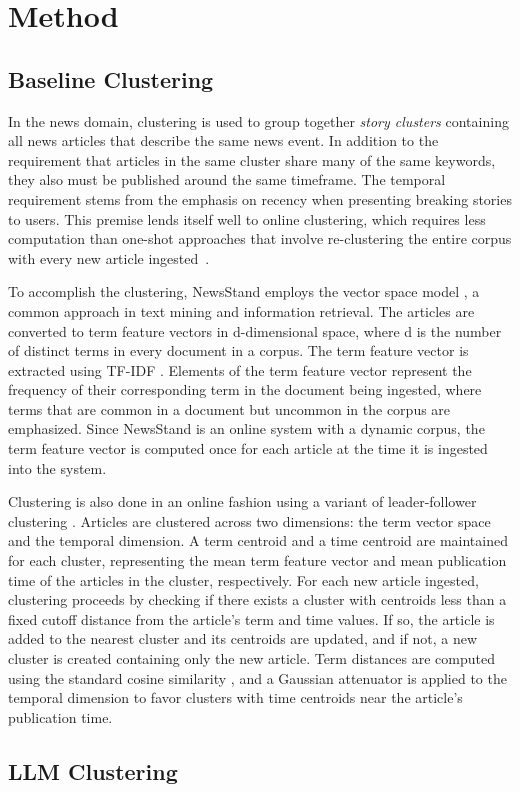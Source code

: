 \section{Method}\label{section:method}


\subsection{Baseline Clustering}
In the news domain, clustering is used to group together \emph{story clusters} containing all news articles that describe the same news event. In addition to the requirement that articles in the same cluster share many of the same keywords, they also must be published around the same timeframe. The temporal requirement stems from the emphasis on recency when presenting breaking stories to users. This premise lends itself well to online clustering, which requires less computation than one-shot approaches that involve re-clustering the entire corpus with every new article ingested~\cite{Teit08}.

To accomplish the clustering, NewsStand employs the vector space model \cite{salton}, a common approach in text mining and information retrieval. The articles are converted to term feature vectors in d-dimensional space, where d is the number of distinct terms in every document in a corpus. The term feature vector is extracted using TF-IDF \cite{salton-buckley}. Elements of the term feature vector represent the frequency of their corresponding term in the document being ingested, where terms that are common in a document but uncommon in the corpus are emphasized. Since NewsStand is an online system with a dynamic corpus, the term feature vector is computed once for each article at the time it is ingested into the system.

Clustering is also done in an online fashion using a variant of leader-follower clustering \cite{Duda73}. Articles are clustered across two dimensions: the term vector space and the temporal dimension. A term centroid and a time centroid are maintained for each cluster, representing the mean term feature vector and mean publication time of the articles in the cluster, respectively. For each new article ingested, clustering proceeds by checking if there exists a cluster with centroids less than a fixed cutoff distance from the article's term and time values. If so, the article is added to the nearest cluster and its centroids are updated, and if not, a new cluster is created containing only the new article. Term distances are computed using the standard cosine similarity \cite{steinbach}, and a Gaussian attenuator is applied to the temporal dimension to favor clusters with time centroids near the article's publication time.

\subsection{LLM Clustering}